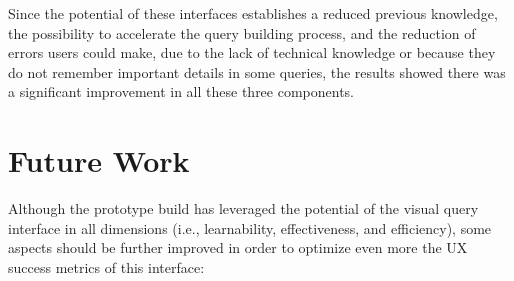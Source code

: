Since the potential of these interfaces establishes a reduced previous knowledge, the possibility to accelerate the query building process, and the reduction of errors users could make, due to the lack of technical knowledge or because they do not remember important details in some queries, the results showed there was a significant improvement in all these three components.

\clearpage

\section{Future Work}
\label{sec:future_work}

Although the prototype build has leveraged the potential of the visual query interface in all dimensions (i.e., learnability, effectiveness, and efficiency), some aspects should be further improved in order to optimize even more the \gls{UX} success metrics of this interface:

